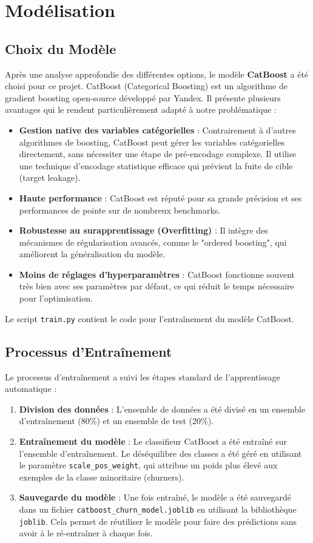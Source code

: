 \chapter{Modélisation}

\section{Choix du Modèle}
Après une analyse approfondie des différentes options, le modèle \textbf{CatBoost} a été choisi pour ce projet. CatBoost (Categorical Boosting) est un algorithme de gradient boosting open-source développé par Yandex. Il présente plusieurs avantages qui le rendent particulièrement adapté à notre problématique :

\begin{itemize}
    \item \textbf{Gestion native des variables catégorielles} : Contrairement à d'autres algorithmes de boosting, CatBoost peut gérer les variables catégorielles directement, sans nécessiter une étape de pré-encodage complexe. Il utilise une technique d'encodage statistique efficace qui prévient la fuite de cible (target leakage).
    \item \textbf{Haute performance} : CatBoost est réputé pour sa grande précision et ses performances de pointe sur de nombreux benchmarks.
    \item \textbf{Robustesse au surapprentissage (Overfitting)} : Il intègre des mécanismes de régularisation avancés, comme le "ordered boosting", qui améliorent la généralisation du modèle.
    \item \textbf{Moins de réglages d'hyperparamètres} : CatBoost fonctionne souvent très bien avec ses paramètres par défaut, ce qui réduit le temps nécessaire pour l'optimisation.
\end{itemize}

Le script \texttt{train.py} contient le code pour l'entraînement du modèle CatBoost.

\section{Processus d'Entraînement}
Le processus d'entraînement a suivi les étapes standard de l'apprentissage automatique :
\begin{enumerate}
    \item \textbf{Division des données} : L'ensemble de données a été divisé en un ensemble d'entraînement (80\%) et un ensemble de test (20\%).
    \item \textbf{Entraînement du modèle} : Le classifieur CatBoost a été entraîné sur l'ensemble d'entraînement. Le déséquilibre des classes a été géré en utilisant le paramètre \texttt{scale\_pos\_weight}, qui attribue un poids plus élevé aux exemples de la classe minoritaire (churners).
    \item \textbf{Sauvegarde du modèle} : Une fois entraîné, le modèle a été sauvegardé dans un fichier \texttt{catboost\_churn\_model.joblib} en utilisant la bibliothèque \texttt{joblib}. Cela permet de réutiliser le modèle pour faire des prédictions sans avoir à le ré-entraîner à chaque fois.
\end{enumerate}

